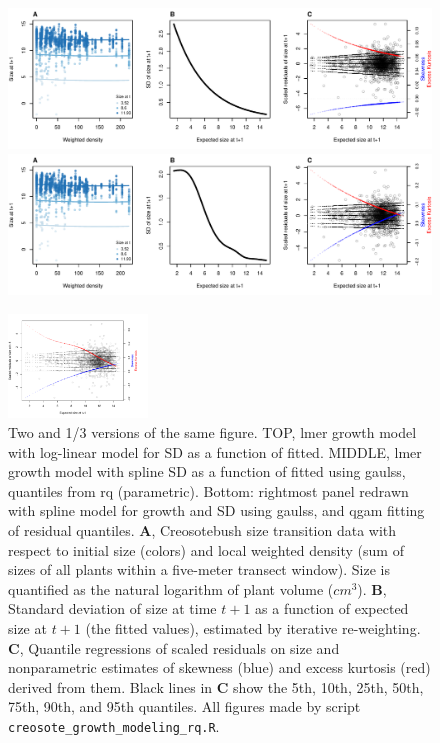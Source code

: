 \documentclass[12pt]{article}
\begin{document}
\begin{figure}[tbp]
	\centering
	\includegraphics[width=1.0\textwidth]{figures/creosote_diagnostics.pdf}
	\includegraphics[width=1.0\textwidth]{figures/creosote_diagnostics_gamSD.pdf}
	\centerline{\includegraphics[width = 0.33\textwidth]{figures/creosote_diagnostics_gaulss_qgam.pdf}}
	\caption{Two and 1/3 versions of the same figure. TOP, lmer growth model with log-linear model for SD as a function of fitted. MIDDLE, lmer growth model with spline SD as a function of fitted using gaulss, 
	quantiles from rq (parametric). Bottom: rightmost panel redrawn with spline model for growth and SD using gaulss, and qgam fitting of residual quantiles. 
		\textbf{A}, Creosotebush size transition data with respect to initial size (colors) and local weighted density (sum of sizes of all plants within a five-meter transect window). Size is quantified as the natural logarithm of plant volume ($cm^3$). \textbf{B}, Standard deviation of size at time $t+1$ as a function of expected size at $t+1$ (the fitted values), estimated by iterative re-weighting. \textbf{C}, Quantile regressions of scaled residuals on size and nonparametric estimates of skewness (blue) and excess kurtosis (red) derived from them. Black lines in \textbf{C} show the 5th, 10th, 25th, 50th, 75th, 90th, and 95th quantiles. All figures made by script \texttt{creosote\_growth\_modeling\_rq.R}.}
	\label{fig:creosote_diagnostics}
\end{figure} 
\end{document}

